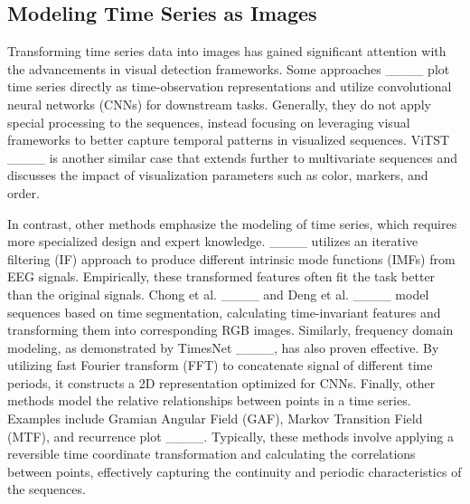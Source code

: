 
\subsection{Modeling Time Series as Images}
Transforming time series data into images has gained significant attention with the advancements in visual detection frameworks. Some approaches ____ plot time series directly as time-observation representations and utilize convolutional neural networks (CNNs) for downstream tasks. Generally, they do not apply special processing to the sequences, instead focusing on leveraging visual frameworks to better capture temporal patterns in visualized sequences. ViTST ____ is another similar case that extends further to multivariate sequences and discusses the impact of visualization parameters such as color, markers, and order. 

In contrast, other methods emphasize the modeling of time series, which requires more specialized design and expert knowledge. ____ utilizes an iterative filtering (IF) approach to produce different intrinsic mode functions (IMFs) from EEG signals. Empirically, these transformed features often fit the task better than the original signals. Chong et al. ____ and Deng et al. ____ model sequences based on time segmentation, calculating time-invariant features and transforming them into corresponding RGB images. Similarly, frequency domain modeling, as demonstrated by TimesNet ____, has also proven effective. By utilizing fast Fourier transform (FFT) to concatenate signal of different time periods, it constructs a 2D representation optimized for CNNs. Finally, other methods model the relative relationships between points in a time series. Examples include Gramian Angular Field (GAF), Markov Transition Field (MTF), and recurrence plot ____. Typically, these methods involve applying a reversible time coordinate transformation and calculating the correlations between points, effectively capturing the continuity and periodic characteristics of the sequences.